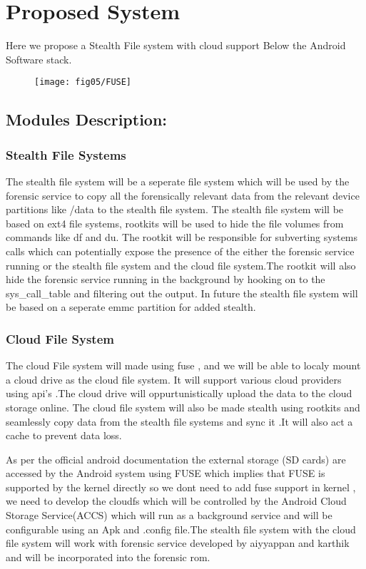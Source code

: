 %
%
\let\textcircled=\pgftextcircled
\chapter{Proposed System}
\label{chap:proposal}

Here we propose a Stealth File system with cloud support  Below the Android  Software stack.
\begin{figure}[h]
   \centering
   \texttt{[image: fig05/FUSE]}
   \label{Proposed System Architecture}
  \end{figure}
 \section{ Modules Description:}
  \subsection{Stealth File Systems}
  The stealth file system will be a seperate file system which will be used by the forensic service to copy all the forensically relevant data from the relevant device partitions like /data to the stealth file system. The stealth file system will be based on ext4 file systems, rootkits will be used to hide the file volumes from commands like df and du. The rootkit will be responsible for subverting systems calls which can potentially expose the presence of the either the forensic service running or the stealth file system and the cloud file system.The rootkit will also hide the forensic service running in the background by hooking on to the sys\_call\_table and filtering out the output. In future the stealth file system will be based on a seperate emmc partition for added stealth.
  \subsection{Cloud File System}
  The cloud File system will made using fuse , and we will be able to localy mount a cloud drive as the cloud file system. It will support various cloud providers using api's .The cloud drive will oppurtunistically upload the data to the cloud storage online. The cloud file system will also be made stealth using rootkits and seamlessly copy data from the stealth file systems and sync it .It will also act a cache to prevent data loss.
  
  As per the official android documentation the external storage (SD cards) are accessed by the Android system using FUSE which implies that FUSE is supported by the kernel directly so we dont need to add fuse support in kernel , we need to develop the cloudfs which will be controlled by the Android Cloud Storage Service(ACCS)  which will run as a background service and will be configurable using an Apk and .config file.The stealth file system with the cloud file system will work with forensic service developed by aiyyappan and karthik and will be incorporated into the forensic rom.
  
  